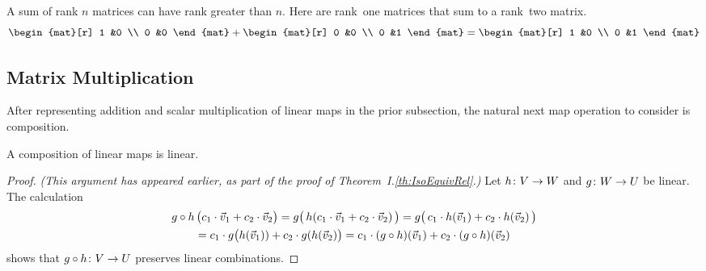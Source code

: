 \begin{exercises}
\begin{answer}
\begin{exparts}
          A sum of rank \( n \) matrices can have rank greater than \( n \).
          Here are rank~one matrices that sum to a rank~two matrix.
          \begin{equation*}
            \begin{mat}[r]
              1  &0  \\
              0  &0
            \end{mat}
            +\begin{mat}[r]
              0  &0  \\
              0  &1
            \end{mat}
            =\begin{mat}[r]
              1  &0  \\
              0  &1
            \end{mat}
          \end{equation*}
      \end{exparts}  
    \end{answer}
\end{exercises}











\subsection{Matrix Multiplication}
After representing addition and scalar multiplication of linear maps
in the prior subsection, the natural next map operation to consider 
is composition.

\begin{lemma}
A composition of linear maps is linear.
\end{lemma}

\begin{proof}
\textit{(This argument has appeared earlier, 
as part of the proof of Theorem~I.\ref{th:IsoEquivRel}.)}  
Let $\mbox{$h\colon V\to W$}$ and $\mbox{$g\colon W\to U$}$ be linear. 
The calculation
\begin{multline*}
  g\mathbin\circ h\,\bigl(c_1\cdot\vec{v}_1+c_2\cdot\vec{v}_2\bigr)
     =g\bigl(\,h(c_1\cdot \vec{v}_1+c_2\cdot\vec{v}_2)\,\bigr)        
     =g\bigl(\,c_1\cdot h(\vec{v}_1)+c_2\cdot h(\vec{v}_2)\,\bigr) \\ 
     =c_1\cdot g\bigl(h(\vec{v}_1))+c_2\cdot g(h(\vec{v}_2)\bigr)  
     =c_1\cdot (g\mathbin\circ h)(\vec{v}_1)
                  +c_2\cdot (g\mathbin\circ h)(\vec{v}_2)
\end{multline*}
shows that $\mbox{$g\mathbin\circ h\colon V\to U$}$
preserves linear combinations.
\end{proof}

